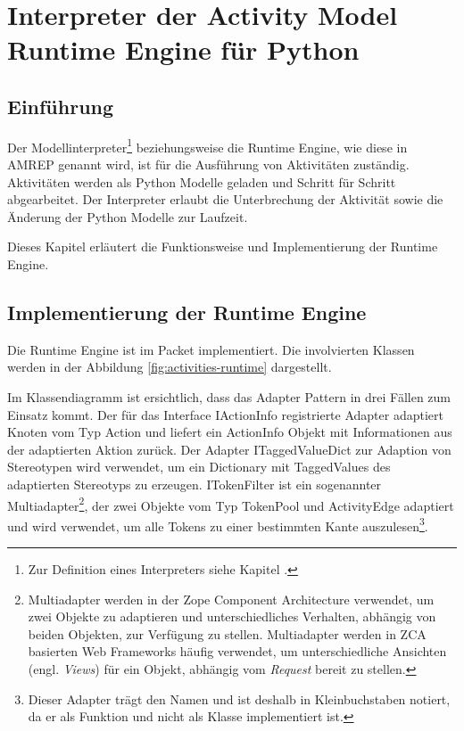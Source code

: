 \chapter{Interpreter der Activity Model Runtime Engine für Python}\label{amrep-runtime}

\section{Einführung}

Der Modellinterpreter\footnote
{Zur Definition eines Interpreters siehe Kapitel .}
beziehungsweise die Runtime Engine, wie diese in AMREP genannt wird, ist für die Ausführung von Aktivitäten zuständig. Aktivitäten werden als Python Modelle geladen und Schritt für Schritt abgearbeitet. Der Interpreter erlaubt die Unterbrechung der Aktivität sowie die Änderung der Python Modelle zur Laufzeit.

Dieses Kapitel erläutert die Funktionsweise und Implementierung der Runtime Engine.


\section{Implementierung der Runtime Engine}

Die Runtime Engine ist im Packet  implementiert. Die involvierten Klassen werden in der Abbildung \ref{fig:activities-runtime} dargestellt.

Im Klassendiagramm ist ersichtlich, dass das Adapter Pattern in drei Fällen zum Einsatz kommt. Der für das Interface IActionInfo registrierte Adapter adaptiert Knoten vom Typ Action und liefert ein ActionInfo Objekt mit Informationen aus der adaptierten Aktion zurück. Der Adapter ITaggedValueDict zur Adaption von Stereotypen wird verwendet, um ein Dictionary mit TaggedValues des adaptierten Stereotyps zu erzeugen. ITokenFilter ist ein sogenannter Multiadapter\footnote
{Multiadapter werden in der Zope Component Architecture verwendet, um zwei Objekte zu adaptieren und unterschiedliches Verhalten, abhängig von beiden Objekten, zur Verfügung zu stellen. Multiadapter werden in ZCA basierten Web Frameworks häufig verwendet, um unterschiedliche Ansichten (engl. \emph{Views}) für ein Objekt, abhängig vom \emph{Request} bereit zu stellen.}, der zwei Objekte vom Typ TokenPool und ActivityEdge adaptiert und wird verwendet, um alle Tokens zu einer bestimmten Kante auszulesen\footnote
{Dieser Adapter trägt den Namen  und ist deshalb in Kleinbuchstaben notiert, da er als Funktion und nicht als Klasse implementiert ist.}.

